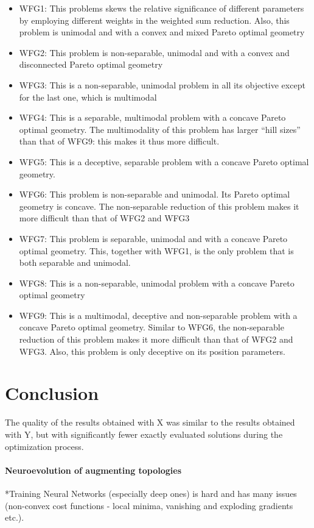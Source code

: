         \begin{itemize}
            \item WFG1: This problems skews the relative significance of different parameters by employing different weights in the weighted sum reduction. Also, this problem is unimodal and with a convex and mixed Pareto optimal geometry
            \item WFG2: This problem is non-separable, unimodal and with a convex and disconnected Pareto optimal geometry
            \item WFG3: This is a non-separable, unimodal problem in all its objective except for the last one, which is multimodal
            \item WFG4: This is a separable, multimodal problem with a concave Pareto optimal geometry. The multimodality of this problem has larger “hill sizes” than that of WFG9: this makes it thus more difficult.
            \item WFG5: This is a deceptive, separable problem with a concave Pareto optimal geometry.
            \item WFG6: This problem is non-separable and unimodal. Its Pareto optimal geometry is concave. The non-separable reduction of this problem makes it more difficult than that of WFG2 and WFG3
            \item WFG7: This problem is separable, unimodal and with a concave Pareto optimal geometry. This, together with WFG1, is the only problem that is both separable and unimodal.
            \item WFG8: This is a non-separable, unimodal problem with a concave Pareto optimal geometry
            \item WFG9: This is a multimodal, deceptive and non-separable problem with a concave Pareto optimal geometry. Similar to WFG6, the non-separable reduction of this problem makes it more difficult than that of WFG2 and WFG3. Also, this problem is only deceptive on its position parameters.
        \end{itemize}

\section{Conclusion}

The quality of the results obtained with X was similar to the results obtained with Y,
 but with significantly fewer exactly evaluated solutions during the optimization process. 


\paragraph{Neuroevolution of augmenting topologies}
 *Training Neural Networks (especially deep ones) is hard and has many issues (non-convex cost functions - local minima, vanishing and exploding gradients etc.).

